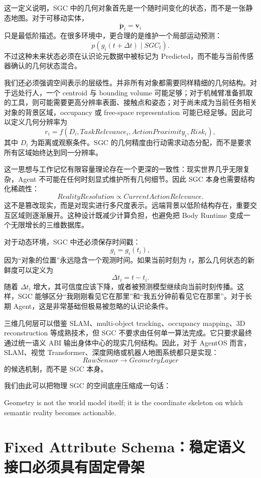 这一定义说明，SGC 中的几何对象首先是一个随时间变化的状态，而不是一张静态地图。对于可移动实体，
\[
\dot{\mathbf p}_i=\mathbf v_i
\]
只是最低阶描述。在很多环境中，更合理的是维护一个局部运动预测：
\[
p(g_i(t+\Delta t)\mid SGC_t).
\]
不过这种未来状态必须在认识论元数据中被标记为 Predicted，而不能与当前传感器确认的几何状态混合。

我们还必须强调空间表示的层级性。并非所有对象都需要同样精细的几何结构。对于远处行人，一个 centroid 与 bounding volume 可能足够；对于机械臂准备抓取的工具，则可能需要更高分辨率表面、接触点和姿态；对于尚未成为当前任务相关对象的背景区域，occupancy 或 free-space representation 可能已经足够。因此可以定义几何分辨率为
\[
r_i=
f(
D_i,
TaskRelevance_i,
ActionProximity_i,
Risk_i
),
\]
其中 $D_i$ 为距离或观察条件。SGC 的几何精度由行动需求动态分配，而不是要求所有区域始终达到同一分辨率。

这一思想与工作记忆有限容量理论存在一个更深的一致性：现实世界几乎无限复杂，Agent 不可能在任何时刻显式维护所有几何细节。因此 SGC 本身也需要结构化稀疏性：
\[
\boxed{
RealityResolution
\propto
CurrentActionRelevance .
}
\]
这不是篡改现实，而是对现实进行多尺度表示。远端背景以低阶结构存在，重要交互区域则逐渐展开。这种设计既减少计算负担，也避免把 Body Runtime 变成一个无限增长的三维数据库。

对于动态环境，SGC 中还必须保存时间戳：
\[
g_i=g_i(t_i),
\]
因为“对象的位置”永远隐含一个观测时间。如果当前时刻为 $t$，那么几何状态的新鲜度可以定义为
\[
\Delta t_i=t-t_i .
\]
随着 $\Delta t_i$ 增大，其可信度应该下降，或者被预测模型继续向当前时刻传播。这样，SGC 能够区分“我刚刚看见它在那里”和“我五分钟前看见它在那里”。对于长期 Agent，这是非常基础但极易被忽略的认识论条件。

三维几何层可以借鉴 SLAM、multi-object tracking、occupancy mapping、3D reconstruction 等成熟技术，但 SGC 不要求由任何单一算法完成。它只要求最终通过统一语义 ABI 输出身体中心的现实几何结构。因此，对于 AgentOS 而言，SLAM、视觉 Transformer、深度网络或机器人地图系统都只是实现：
\[
RawSensor
\rightarrow
GeometryLayer
\]
的候选机制，而不是 SGC 本身。

我们由此可以把物理 SGC 的空间底座压缩成一句话：
\begin{conclusion}
Geometry is not the world model itself; it is the coordinate skeleton on which
semantic reality becomes actionable.
\end{conclusion}

\section{Fixed Attribute Schema：稳定语义接口必须具有固定骨架}

